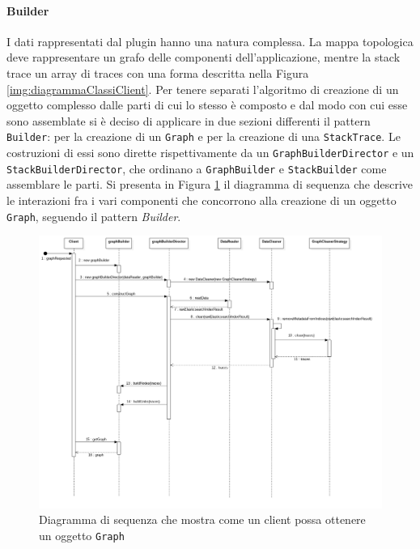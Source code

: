 \paragraph{Builder} \Spazio
\label{sec:patternBuilder}
I dati rappresentati dal plugin hanno una natura complessa. La mappa topologica deve rappresentare un grafo delle componenti dell'applicazione, mentre la stack trace un array di traces con una forma descritta nella Figura \ref{img:diagrammaClassiClient}. Per tenere separati l'algoritmo di creazione di un oggetto complesso dalle parti di cui lo stesso è composto e dal modo con cui esse sono assemblate si è deciso di applicare in due sezioni differenti il pattern \texttt{Builder}: per la creazione di un \texttt{Graph} e per la creazione di una \texttt{StackTrace}. Le costruzioni di essi sono dirette rispettivamente da un \texttt{GraphBuilderDirector} e un \texttt{StackBuilderDirector}, che ordinano a \texttt{GraphBuilder} e \texttt{StackBuilder} come assemblare le parti. 
Si presenta in Figura \ref{img:builderGraph} il diagramma di sequenza che descrive le interazioni fra i vari componenti che concorrono alla creazione di un oggetto \texttt{Graph}, seguendo il pattern \emph{Builder}.


\begin{figure}[H]
	\centering
	\includegraphics[width=1\textwidth]{Images/builderGraphSequence.png}
	\caption{Diagramma di sequenza che mostra come un client possa ottenere un oggetto \texttt{Graph}}
	\label{img:builderGraph}
\end{figure}

